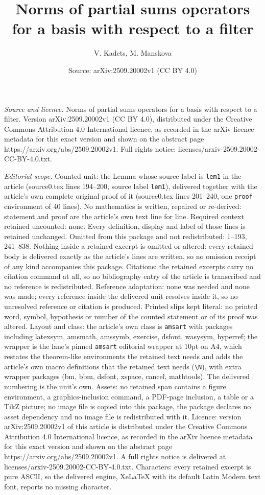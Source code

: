 \documentclass[10pt,a4paper]{amsart}
\title[Norms of partial sums operators for a basis with respect to ]{Norms of partial sums operators for a basis with respect to a filter}
\author{V. Kadets, M. Manskova}
\date{Source: arXiv:2509.20002v1 (CC BY 4.0)}
\begin{document}
\maketitle

\noindent\emph{Source and licence.} Norms of partial sums operators for a basis with respect to a filter. Version arXiv:2509.20002v1 (CC BY 4.0), distributed under the Creative Commons Attribution 4.0 International licence, as recorded in the arXiv licence metadata for this exact version and shown on the abstract page https://arxiv.org/abs/2509.20002v1. Full rights notice: licenses/arxiv-2509.20002-CC-BY-4.0.txt.\par\smallskip

\noindent\textit{Editorial scope.} Counted unit: the Lemma whose source label is \texttt{lem1} in the article (source0.tex lines 194--200, source label \texttt{lem1}), delivered together with the article's own complete original proof of it (source0.tex lines 201--240, one \texttt{proof} environment of 40 lines). No mathematics is written, repaired or re-derived: statement and proof are the article's own text line for line. Required context retained uncounted: none. Every definition, display and label of those lines is retained unchanged. Omitted from this package and not redistributed: 1--193, 241--838. Nothing inside a retained excerpt is omitted or altered: every retained body is delivered exactly as the article's lines are written, so no omission receipt of any kind accompanies this package. Citations: the retained excerpts carry no citation command at all, so no bibliography entry of the article is transcribed and no reference is redistributed. Reference adaptation: none was needed and none was made; every reference inside the delivered unit resolves inside it, so no unresolved reference or citation is produced. Printed slips kept literal: no printed word, symbol, hypothesis or number of the counted statement or of its proof was altered. Layout and class: the article's own class is \texttt{amsart} with packages including latexsym, amsmath, amssymb, exercise, dsfont, wasysym, hyperref; the wrapper is the lane's pinned \texttt{amsart} editorial wrapper at 10pt on A4, which restates the theorem-like environments the retained text needs and adds the article's own macro definitions that the retained text needs (\texttt{\textbackslash N}), with extra wrapper packages (bm, bbm, dsfont, xspace, cancel, mathtools). The delivered numbering is the unit's own. Assets: no retained span contains a figure environment, a graphics-inclusion command, a PDF-page inclusion, a table or a TikZ picture; no image file is copied into this package, the package declares no asset dependency and no image file is redistributed with it. Licence: version arXiv:2509.20002v1 of this article is distributed under the Creative Commons Attribution 4.0 International licence, as recorded in the arXiv licence metadata for this exact version and shown on the abstract page https://arxiv.org/abs/2509.20002v1. A full rights notice is delivered at licenses/arxiv-2509.20002-CC-BY-4.0.txt. Characters: every retained excerpt is pure ASCII, so the delivered engine, XeLaTeX with its default Latin Modern text font, reports no missing character.
\end{document}
